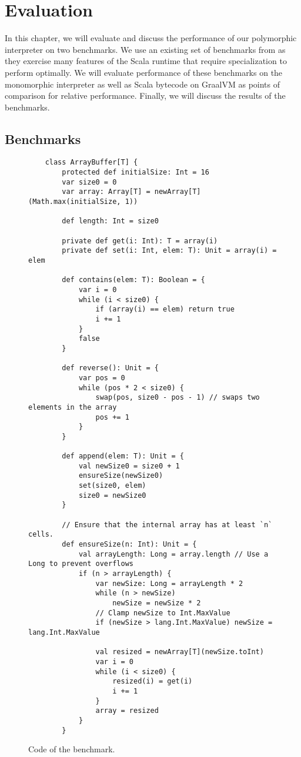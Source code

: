 \chapter{Evaluation}

In this chapter, we will evaluate and discuss the performance of our polymorphic interpreter on two benchmarks.
We use an existing set of benchmarks from \cite{scala:miniboxing} as they exercise many features of the Scala runtime that require specialization to perform optimally.
We will evaluate performance of these benchmarks on the monomorphic interpreter as well as Scala bytecode on GraalVM as points of comparison for relative performance.
Finally, we will discuss the results of the benchmarks.

\section{Benchmarks}
\begin{figure}[!htb]
	\begin{verbatim}
	class ArrayBuffer[T] {
		protected def initialSize: Int = 16
		var size0 = 0
		var array: Array[T] = newArray[T](Math.max(initialSize, 1))
		
		def length: Int = size0
		
		private def get(i: Int): T = array(i)
		private def set(i: Int, elem: T): Unit = array(i) = elem
		
		def contains(elem: T): Boolean = {
			var i = 0
			while (i < size0) {
				if (array(i) == elem) return true
				i += 1
			}
			false
		}
		
		def reverse(): Unit = {
			var pos = 0
			while (pos * 2 < size0) {
				swap(pos, size0 - pos - 1) // swaps two elements in the array
				pos += 1
			}
		}
		
		def append(elem: T): Unit = {
			val newSize0 = size0 + 1
			ensureSize(newSize0)
			set(size0, elem)
			size0 = newSize0
		}
		
		// Ensure that the internal array has at least `n` cells. 
		def ensureSize(n: Int): Unit = {
			val arrayLength: Long = array.length // Use a Long to prevent overflows
			if (n > arrayLength) {
				var newSize: Long = arrayLength * 2
				while (n > newSize)
					newSize = newSize * 2
				// Clamp newSize to Int.MaxValue
				if (newSize > lang.Int.MaxValue) newSize = lang.Int.MaxValue
				
				val resized = newArray[T](newSize.toInt)
				var i = 0
				while (i < size0) {
					resized(i) = get(i)
					i += 1
				}
				array = resized
			}
		}
	\end{verbatim}
	\caption{Code of the  benchmark.}
	\label{example:arraybuffer-benchmark}
\end{figure}

